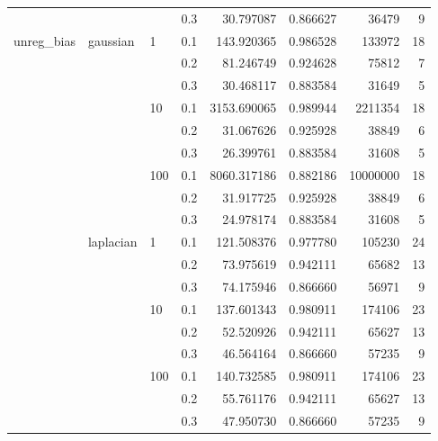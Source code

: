\begin{table}[H]
\begin{tabular}{llllrrrr}
           &           &     & 0.3 &    30.797087 &  0.866627 &     36479 &     9 \\
unreg\_bias & gaussian & 1   & 0.1 &   143.920365 &  0.986528 &    133972 &    18 \\
           &           &     & 0.2 &    81.246749 &  0.924628 &     75812 &     7 \\
           &           &     & 0.3 &    30.468117 &  0.883584 &     31649 &     5 \\
           &           & 10  & 0.1 &  3153.690065 &  0.989944 &   2211354 &    18 \\
           &           &     & 0.2 &    31.067626 &  0.925928 &     38849 &     6 \\
           &           &     & 0.3 &    26.399761 &  0.883584 &     31608 &     5 \\
           &           & 100 & 0.1 &  8060.317186 &  0.882186 &  10000000 &    18 \\
           &           &     & 0.2 &    31.917725 &  0.925928 &     38849 &     6 \\
           &           &     & 0.3 &    24.978174 &  0.883584 &     31608 &     5 \\
           & laplacian & 1   & 0.1 &   121.508376 &  0.977780 &    105230 &    24 \\
           &           &     & 0.2 &    73.975619 &  0.942111 &     65682 &    13 \\
           &           &     & 0.3 &    74.175946 &  0.866660 &     56971 &     9 \\
           &           & 10  & 0.1 &   137.601343 &  0.980911 &    174106 &    23 \\
           &           &     & 0.2 &    52.520926 &  0.942111 &     65627 &    13 \\
           &           &     & 0.3 &    46.564164 &  0.866660 &     57235 &     9 \\
           &           & 100 & 0.1 &   140.732585 &  0.980911 &    174106 &    23 \\
           &           &     & 0.2 &    55.761176 &  0.942111 &     65627 &    13 \\
           &           &     & 0.3 &    47.950730 &  0.866660 &     57235 &     9 \\
\bottomrule
\end{tabular}
\end{table}
